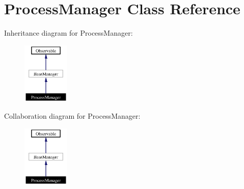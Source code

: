 \section{Process\-Manager Class Reference}
\label{classProcessManager}
Inheritance diagram for Process\-Manager:\begin{figure}[H]
\begin{center}
\leavevmode
\includegraphics[width=63pt]{classProcessManager__inherit__graph}
\end{center}
\end{figure}
Collaboration diagram for Process\-Manager:\begin{figure}[H]
\begin{center}
\leavevmode
\includegraphics[width=63pt]{classProcessManager__coll__graph}
\end{center}
\end{figure}
